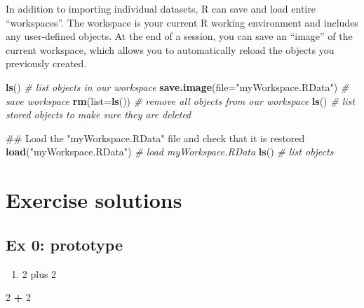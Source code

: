 \documentclass[]{book}
\newenvironment{Shaded}{\begin{snugshade}}{\end{snugshade}}
\newcommand{\KeywordTok}[1]{\textcolor[rgb]{0.13,0.29,0.53}{\textbf{#1}}}
\newcommand{\DataTypeTok}[1]{\textcolor[rgb]{0.13,0.29,0.53}{#1}}
\newcommand{\DecValTok}[1]{\textcolor[rgb]{0.00,0.00,0.81}{#1}}
\newcommand{\StringTok}[1]{\textcolor[rgb]{0.31,0.60,0.02}{#1}}
\newcommand{\CommentTok}[1]{\textcolor[rgb]{0.56,0.35,0.01}{\textit{#1}}}
\newcommand{\OperatorTok}[1]{\textcolor[rgb]{0.81,0.36,0.00}{\textbf{#1}}}
\newcommand{\NormalTok}[1]{#1}
\providecommand{\tightlist}{%
  \setlength{\itemsep}{0pt}\setlength{\parskip}{0pt}}
\begin{document}
In addition to importing individual datasets, R can save and load entire
``workspaces''. The workspace is your current R working environment and
includes any user-defined objects. At the end of a session, you can save
an ``image'' of the current workspace, which allows you to automatically
reload the objects you previously created.

\begin{Shaded}
\begin{Highlighting}[]
\KeywordTok{ls}\NormalTok{() }\CommentTok{# list objects in our workspace}
\KeywordTok{save.image}\NormalTok{(}\DataTypeTok{file=}\StringTok{"myWorkspace.RData"}\NormalTok{) }\CommentTok{# save workspace }
\KeywordTok{rm}\NormalTok{(}\DataTypeTok{list=}\KeywordTok{ls}\NormalTok{()) }\CommentTok{# remove all objects from our workspace }
\KeywordTok{ls}\NormalTok{() }\CommentTok{# list stored objects to make sure they are deleted}
\end{Highlighting}
\end{Shaded}

\begin{Shaded}
\begin{Highlighting}[]
\NormalTok{## Load the "myWorkspace.RData" file and check that it is restored}
\KeywordTok{load}\NormalTok{(}\StringTok{"myWorkspace.RData"}\NormalTok{) }\CommentTok{# load myWorkspace.RData}
\KeywordTok{ls}\NormalTok{() }\CommentTok{# list objects}
\end{Highlighting}
\end{Shaded}

\section{Exercise solutions}\label{exercise-solutions}

\subsection{Ex 0: prototype}\label{ex-0-prototype}

\begin{enumerate}
\def\labelenumi{\arabic{enumi}.}
\tightlist
\item
  2 plus 2
\end{enumerate}

\begin{Shaded}
\begin{Highlighting}[]
\DecValTok{2} \OperatorTok{+}\StringTok{ }\DecValTok{2}
\end{Highlighting}
\end{Shaded}
\end{document}
